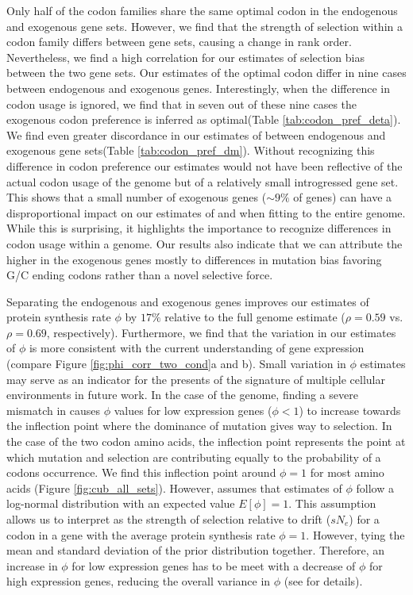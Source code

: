 \documentclass[12pt]{article}
\begin{document}
Only half of the codon families share the same optimal codon in the endogenous and exogenous gene sets.
However, we find that the strength of selection within a codon family differs between gene sets, causing a change in rank order.
Nevertheless, we find a high correlation for our estimates of selection bias \DE between the two gene sets.
Our estimates of the optimal codon differ in nine cases between endogenous and exogenous genes.
Interestingly, when the difference in codon usage is ignored, we find that in seven out of these nine cases the exogenous codon preference is inferred as optimal(Table \ref{tab:codon_pref_deta}).
We find even greater discordance in our estimates of \DM between endogenous and exogenous gene sets(Table \ref{tab:codon_pref_dm}).
Without recognizing this difference in codon preference our estimates would not have been reflective of the actual codon usage of the \kluyveri genome but of a relatively small introgressed gene set.
This shows that a small number of exogenous genes ($\sim 9 \%$ of genes) can have a disproportional impact on our estimates of \DM and \DE when fitting \ROC to the entire \kluyveri genome.
While this is surprising, it highlights the importance to recognize differences in codon usage within a genome.
Our results also indicate that we can attribute the higher \GC in the exogenous genes mostly to differences in mutation bias favoring G/C ending codons rather than a novel selective force.

Separating the endogenous and exogenous genes improves our estimates of protein synthesis rate $\phi$ by $17 \%$ relative to the full genome estimate ($\rho = 0.59$ vs. $\rho = 0.69$, respectively).
Furthermore, we find that the variation in our estimates of $\phi$ is more consistent with the current understanding of gene expression (compare Figure \ref{fig:phi_corr_two_cond}a and b). 
Small variation in $\phi$ estimates may serve as an indicator for the presents of the signature of multiple cellular environments in future work.
In the case of the \kluyveri genome, finding a severe mismatch in \DM causes $\phi$ values for low expression genes ($\phi < 1$) to increase towards the inflection point where the dominance of mutation gives way to selection.
In the case of the two codon amino acids, the inflection point represents the point at which mutation and selection are contributing equally to the probability of a codons occurrence.
We find this inflection point around $\phi = 1$ for most amino acids (Figure \ref{fig:cub_all_sets}). 
However, \ROC assumes that estimates of $\phi$ follow a log-normal distribution with an expected value $E[\phi] = 1$. 
This assumption allows us to interpret \DE as the strength of selection relative to drift ($sN_e$) for a codon in a gene with the average protein synthesis rate $\phi = 1$.
However, tying the mean and standard deviation of the prior distribution together.
Therefore, an increase in $\phi$ for low expression genes has to be meet with a decrease of $\phi$ for high expression genes, reducing the overall variance in $\phi$ (see \citet{gilchrist2015} for details). 
\end{document}
